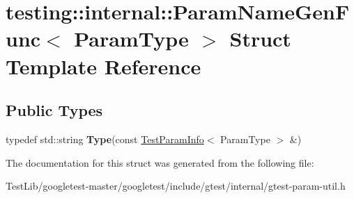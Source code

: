 \hypertarget{structtesting_1_1internal_1_1ParamNameGenFunc}{}\section{testing\+:\+:internal\+:\+:Param\+Name\+Gen\+Func$<$ Param\+Type $>$ Struct Template Reference}
\label{structtesting_1_1internal_1_1ParamNameGenFunc}
\subsection*{Public Types}
\begin{DoxyCompactItemize}
\item 
\mbox{\label{structtesting_1_1internal_1_1ParamNameGenFunc_adf1ce5df22a930ae715082862d72590f}} 
typedef std\+::string {\bfseries Type}(const \hyperlink{structtesting_1_1TestParamInfo}{Test\+Param\+Info}$<$ Param\+Type $>$ \&)
\end{DoxyCompactItemize}


The documentation for this struct was generated from the following file\+:\begin{DoxyCompactItemize}
\item 
Test\+Lib/googletest-\/master/googletest/include/gtest/internal/gtest-\/param-\/util.\+h\end{DoxyCompactItemize}
